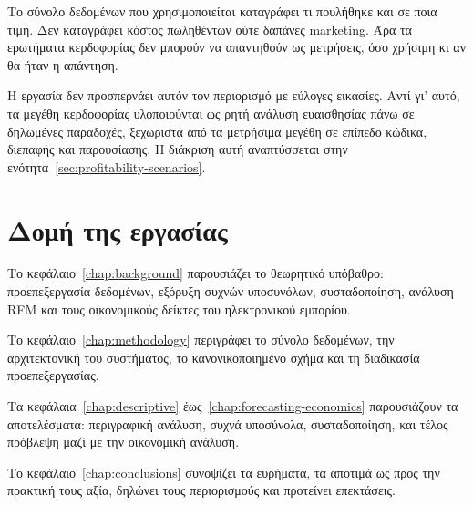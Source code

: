 Το σύνολο δεδομένων που χρησιμοποιείται καταγράφει τι πουλήθηκε και σε ποια
τιμή. Δεν καταγράφει κόστος πωληθέντων ούτε δαπάνες marketing. Άρα τα ερωτήματα
κερδοφορίας δεν μπορούν να απαντηθούν ως μετρήσεις, όσο χρήσιμη κι αν θα ήταν η
απάντηση.

Η εργασία δεν προσπερνάει αυτόν τον περιορισμό με εύλογες εικασίες. Αντί γι'
αυτό, τα μεγέθη κερδοφορίας υλοποιούνται ως ρητή ανάλυση ευαισθησίας πάνω σε
δηλωμένες παραδοχές, ξεχωριστά από τα μετρήσιμα μεγέθη σε επίπεδο κώδικα,
διεπαφής και παρουσίασης. Η διάκριση αυτή αναπτύσσεται στην
ενότητα~\ref{sec:profitability-scenarios}.

\section{Δομή της εργασίας}

Το κεφάλαιο~\ref{chap:background} παρουσιάζει το θεωρητικό υπόβαθρο:
προεπεξεργασία δεδομένων, εξόρυξη συχνών υποσυνόλων, συσταδοποίηση, ανάλυση
RFM και τους οικονομικούς δείκτες του ηλεκτρονικού εμπορίου.

Το κεφάλαιο~\ref{chap:methodology} περιγράφει το σύνολο δεδομένων, την
αρχιτεκτονική του συστήματος, το κανονικοποιημένο σχήμα και τη διαδικασία
προεπεξεργασίας.

Τα κεφάλαια~\ref{chap:descriptive} έως~\ref{chap:forecasting-economics}
παρουσιάζουν τα αποτελέσματα: περιγραφική ανάλυση, συχνά υποσύνολα,
συσταδοποίηση, και τέλος πρόβλεψη μαζί με την οικονομική ανάλυση.

Το κεφάλαιο~\ref{chap:conclusions} συνοψίζει τα ευρήματα, τα αποτιμά ως προς
την πρακτική τους αξία, δηλώνει τους περιορισμούς και προτείνει επεκτάσεις.
